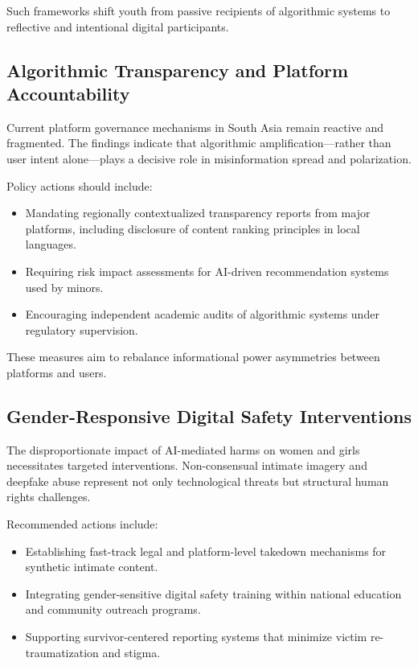 \documentclass[12pt,a4paper]{report}
\begin{document}
Such frameworks shift youth from passive recipients of algorithmic systems to reflective and intentional digital participants.

\subsection{Algorithmic Transparency and Platform Accountability}

Current platform governance mechanisms in South Asia remain reactive and fragmented. The findings indicate that algorithmic amplification—rather than user intent alone—plays a decisive role in misinformation spread and polarization.

Policy actions should include:
\begin{itemize}
  \item Mandating regionally contextualized transparency reports from major platforms, including disclosure of content ranking principles in local languages.
  \item Requiring risk impact assessments for AI-driven recommendation systems used by minors.
  \item Encouraging independent academic audits of algorithmic systems under regulatory supervision.
\end{itemize}

These measures aim to rebalance informational power asymmetries between platforms and users.

\subsection{Gender-Responsive Digital Safety Interventions}

The disproportionate impact of AI-mediated harms on women and girls necessitates targeted interventions. Non-consensual intimate imagery and deepfake abuse represent not only technological threats but structural human rights challenges.

Recommended actions include:
\begin{itemize}
  \item Establishing fast-track legal and platform-level takedown mechanisms for synthetic intimate content.
  \item Integrating gender-sensitive digital safety training within national education and community outreach programs.
  \item Supporting survivor-centered reporting systems that minimize victim re-traumatization and stigma.
\end{itemize}
\end{document}
